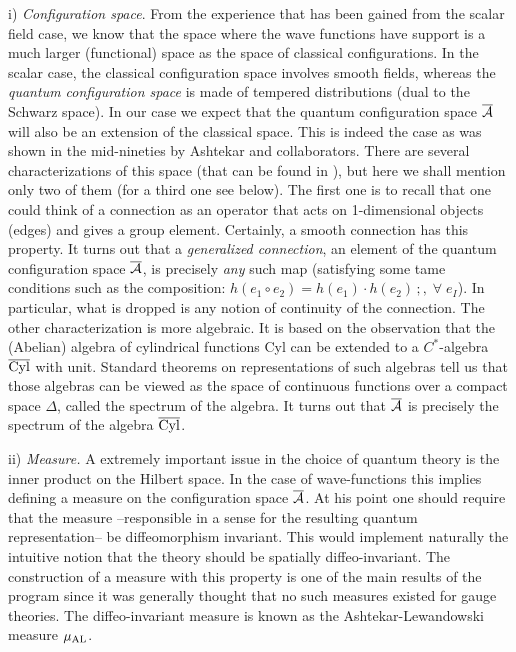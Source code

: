 \documentclass[aps,prd,tightenlines,showpacs,nofootinbib,preprint]{revtex4}
\begin{document}
i) {\it Configuration space}. From the experience that has been
gained from the scalar field case, we know that the space where
the wave functions have support is a much larger (functional)
space as the space of classical configurations. In the scalar
case, the classical configuration space involves smooth fields,
whereas the {\it quantum configuration space} is made of tempered
distributions (dual to the Schwarz space). In our case we expect
that the quantum configuration space $\overline{\cal A}$ will also
be an extension of the classical space. This is indeed the case as
was shown in the mid-nineties by Ashtekar and collaborators. There
are several characterizations of this space (that can be found in
\cite{AL:review, Thiemann:2001yy, Velhinho}), but here we shall
mention only two of them (for a third one see below). The first
one is to recall that one could think of a connection as an
operator that acts on 1-dimensional objects (edges) and gives a
group element. Certainly, a smooth connection has this property.
It turns out that a {\it generalized connection}, an element of
the quantum configuration space $\overline{\cal A}$, is precisely
{\it any} such map (satisfying some tame conditions such as the
composition: $h(e_1\circ e_2)=h(e_1)\cdot h(e_2)\,;,\;\forall\;
e_I$). In particular, what is dropped is any notion of continuity
of the connection. The other characterization is more algebraic.
It is based on the observation that the (Abelian) algebra of
cylindrical functions Cyl can be extended to a $C^*$-algebra
$\overline{\rm Cyl}$ with unit. Standard theorems on
representations of such algebras tell us that those algebras can
be viewed as the space of continuous functions over a compact
space $\Delta$, called the spectrum of the algebra. It turns out
that $\overline{\cal A}$ is precisely the spectrum of the algebra
$\overline{\rm Cyl}$.


ii) {\it Measure.} A extremely important issue in the choice of
quantum theory is the inner product on the Hilbert space. In the
case of wave-functions this implies defining a measure on the
configuration space $\overline{\cal A}$. At his point one should
require that the measure --responsible in a sense for the
resulting quantum representation-- be diffeomorphism invariant.
This would implement naturally the intuitive notion that the
theory should be spatially diffeo-invariant. The construction of a
measure with this property is one of the main results of the
program since it was generally thought that   no such measures
existed for gauge theories. The diffeo-invariant measure is known
as the Ashtekar-Lewandowski measure $\mu_{\rm AL}$.
\end{document}
